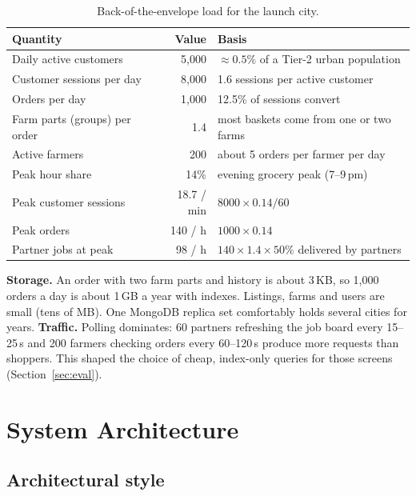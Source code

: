 \documentclass[11pt,a4paper]{article}
\begin{document}
\begin{table}[H]\centering\small
\begin{tabular}{@{}lrl@{}}
\toprule
\textbf{Quantity} & \textbf{Value} & \textbf{Basis} \\
\midrule
Daily active customers & 5{,}000 & $\approx 0.5\%$ of a Tier-2 urban population \\
Customer sessions per day & 8{,}000 & 1.6 sessions per active customer \\
Orders per day & 1{,}000 & 12.5\% of sessions convert \\
Farm parts (groups) per order & 1.4 & most baskets come from one or two farms \\
Active farmers & 200 & about 5 orders per farmer per day \\
Peak hour share & 14\% & evening grocery peak (7--9\,pm) \\
Peak customer sessions & 18.7 / min & $8000 \times 0.14 / 60$ \\
Peak orders & 140 / h & $1000 \times 0.14$ \\
Partner jobs at peak & 98 / h & $140 \times 1.4 \times 50\%$ delivered by partners \\
\bottomrule
\end{tabular}
\caption{Back-of-the-envelope load for the launch city.}
\end{table}

\noindent \textbf{Storage.} An order with two farm parts and history is about 3\,KB, so 1{,}000 orders a day is about 1\,GB a year with indexes. Listings, farms and users are small (tens of MB). One MongoDB replica set comfortably holds several cities for years. \textbf{Traffic.} Polling dominates: 60 partners refreshing the job board every 15--25\,s and 200 farmers checking orders every 60--120\,s produce more requests than shoppers. This shaped the choice of cheap, index-only queries for those screens (Section~\ref{sec:eval}).

\section{System Architecture}

\subsection{Architectural style}
\end{document}
